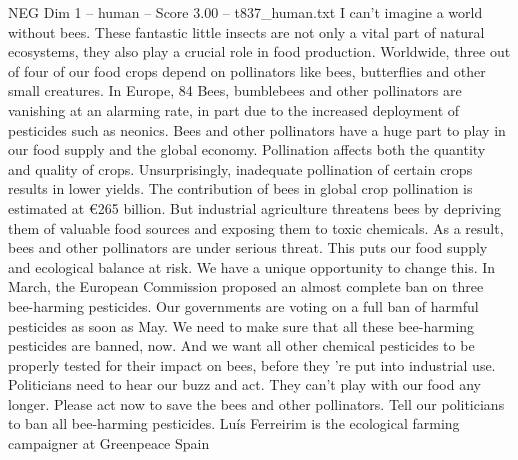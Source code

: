\begin{textsample}{NEG Dim 1 – human – Score 3.00 – t837\_human.txt}  \label{ex:f1_neg_044}
I can't imagine a world without bees.
These fantastic little insects are not only a vital part of natural ecosystems, they also play a crucial role in food production.
Worldwide, three out of four of our food crops depend on pollinators like bees, butterflies and other small creatures.
In Europe, 84 %
Bees, bumblebees and other pollinators are vanishing at an alarming rate, in part due to the increased deployment of pesticides such as neonics.
Bees and other pollinators have a huge part to play in our food supply and the global economy.
Pollination affects both the quantity and quality of crops.
Unsurprisingly, inadequate pollination of certain crops results in lower yields.
The contribution of bees in global crop pollination is estimated at €265 billion.
But industrial agriculture threatens bees by depriving them of valuable food sources and exposing them to toxic chemicals.
As a result, bees and other pollinators are under serious threat.
This puts our food supply and ecological balance at risk.
We have a unique opportunity to change this.
In March, the European Commission proposed an almost complete ban on three bee-harming pesticides.
Our governments are voting on a full ban of harmful pesticides as soon as May.
We need to make sure that all these bee-harming pesticides are banned, now.
And we want all other chemical pesticides to be properly tested for their impact on bees, before they ’re put into industrial use.
Politicians need to hear our buzz and act.
They can't play with our food any longer.
Please act now to save the bees and other pollinators.
Tell our politicians to ban all bee-harming pesticides.
Luís Ferreirim is the ecological farming campaigner at Greenpeace Spain

\end{textsample}
